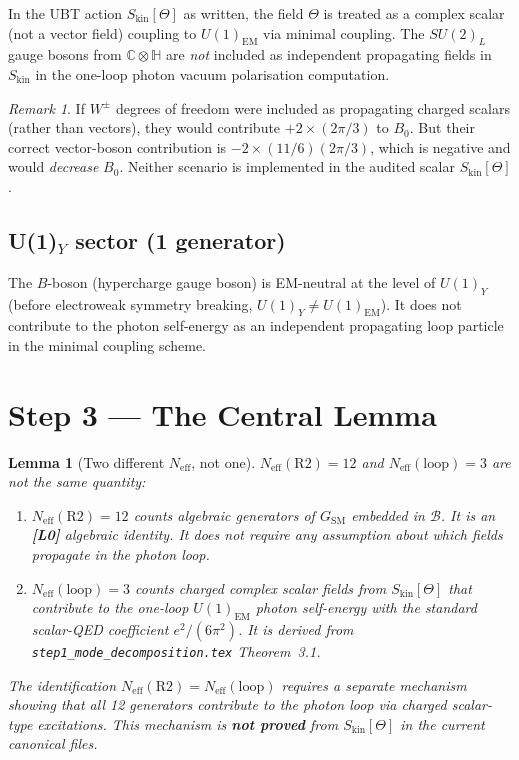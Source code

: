 \documentclass[12pt,a4paper]{article}
\newtheorem{lemma}[theorem]{Lemma}
\theoremstyle{remark}
\newtheorem{remark}[theorem]{Remark}
\newcommand{\Neff}{N_{\mathrm{eff}}}
\begin{document}
In the UBT action $S_{\mathrm{kin}}[\Theta]$ as written, the field $\Theta$
is treated as a complex scalar (not a vector field) coupling to
$U(1)_{\mathrm{EM}}$ via minimal coupling.  The $SU(2)_L$ gauge bosons
from $\mathbb{C}\otimes\mathbb{H}$ are \emph{not} included as independent
propagating fields in $S_{\mathrm{kin}}$ in the one-loop photon
vacuum polarisation computation.

\begin{remark}
If $W^\pm$ degrees of freedom were included as propagating charged scalars
(rather than vectors), they would contribute $+2 \times (2\pi/3)$ to $B_0$.
But their correct vector-boson contribution is $-2 \times (11/6)(2\pi/3)$,
which is negative and would \emph{decrease} $B_0$.  Neither scenario is
implemented in the audited scalar $S_{\mathrm{kin}}[\Theta]$.
\end{remark}

\subsection{U(1)$_Y$ sector (1 generator)}

The $B$-boson (hypercharge gauge boson) is EM-neutral at the level of
$U(1)_Y$ (before electroweak symmetry breaking, $U(1)_Y \neq U(1)_{\mathrm{EM}}$).
It does not contribute to the photon self-energy as an independent
propagating loop particle in the minimal coupling scheme.

\section{Step 3 — The Central Lemma}
\label{sec:lemma}

\begin{lemma}[Two different $\Neff$, not one]
\label{lem:two_Neff}
$\Neff(\mathrm{R2}) = 12$ and $\Neff(\mathrm{loop}) = 3$ are not the same
quantity:

\begin{enumerate}
  \item $\Neff(\mathrm{R2}) = 12$ counts \emph{algebraic generators of
        $G_{\mathrm{SM}}$ embedded in $\mathcal{B}$}.  It is an
        \textbf{[L0]} algebraic identity.  It does not require any
        assumption about which fields propagate in the photon loop.
  \item $\Neff(\mathrm{loop}) = 3$ counts \emph{charged complex scalar
        fields from $S_{\mathrm{kin}}[\Theta]$} that contribute to the
        one-loop $U(1)_{\mathrm{EM}}$ photon self-energy with the standard
        scalar-QED coefficient $e^2/(6\pi^2)$.  It is derived from
        \texttt{step1\_mode\_decomposition.tex} Theorem~3.1.
\end{enumerate}

The identification $\Neff(\mathrm{R2}) = \Neff(\mathrm{loop})$ requires
a separate mechanism showing that \emph{all} 12 generators contribute to
the photon loop via charged scalar-type excitations.  This mechanism is
\textbf{not proved} from $S_{\mathrm{kin}}[\Theta]$ in the current canonical
files.
\end{lemma}
\end{document}
